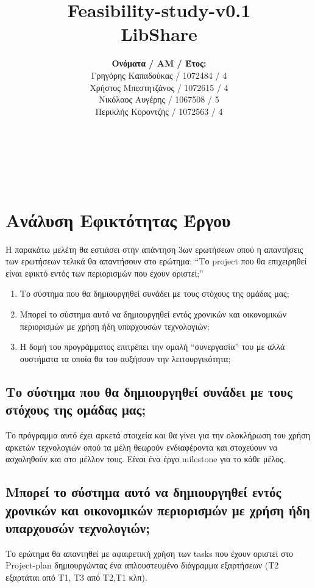 \documentclass[12pt,a4paper]{article}
\title{Feasibility-study-v0.1 \\ LibShare}
\author{\textbf{Ονόματα / ΑΜ / Έτος:} \\ Γρηγόρης Καπαδούκας / 1072484 / 4\textdegree \\ Χρήστος Μπεστητζάνος / 1072615 / 4\textdegree \\ Νικόλαος Αυγέρης / 1067508 / 5\textdegree \\ Περικλής Κοροντζής / 1072563 / 4\textdegree}
\begin{document}
\makeatletter
\begin{center}
	\LARGE{\@title} \\
	\pagebreak
\end{center}
\begin{LARGE}\@author\end{LARGE} \\
\pagebreak

\section{Ανάλυση Εφικτότητας Έργου}

Η παρακάτω μελέτη θα εστιάσει στην απάντηση 3ων ερωτήσεων οπού η απαντήσεις των ερωτήσεων τελικά θα απαντήσουν στο ερώτημα:
“Το project που θα επιχειρηθεί είναι εφικτό εντός των περιορισμών που έχουν οριστεί;”

\begin{enumerate}
	\item Το σύστημα που θα δημιουργηθεί συνάδει με τους στόχους της ομάδας μας;
	\item Μπορεί το σύστημα αυτό να δημιουργηθεί εντός  χρονικών και οικονομικών περιορισμών με χρήση ήδη υπαρχουσών τεχνολογιών;
	\item Η δομή του προγράμματος επιτρέπει την ομαλή “συνεργασία” του με αλλά συστήματα τα οποία θα του αυξήσουν την λειτουργικότητα;
\end{enumerate}


\subsection{Το σύστημα που θα δημιουργηθεί συνάδει με τους στόχους της ομάδας μας;}

Το πρόγραμμα αυτό έχει αρκετά στοιχεία και θα γίνει για την ολοκλήρωση του χρήση αρκετών τεχνολογιών οπού τα μέλη θεωρούν ενδιαφέροντα και στοχεύουν να ασχοληθούν και στο μέλλον τους. Είναι ένα έργο milestone για το κάθε μέλος.

\subsection{Μπορεί το σύστημα αυτό να δημιουργηθεί εντός  χρονικών και οικονομικών περιορισμών με χρήση ήδη υπαρχουσών τεχνολογιών;}

Το  ερώτημα θα απαντηθεί με αφαιρετική χρήση των tasks που έχουν οριστεί στο Project-plan δημιουργώντας ένα απλουστευμένο διάγραμμα εξαρτήσεων (Τ2 εξαρτάται από Τ1, Τ3 από Τ2,Τ1 κλπ).
\end{document}
